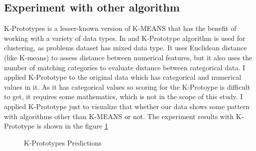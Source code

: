 \documentclass[12pt]{article}
\begin{document}
\subsection{Experiment with other algorithm}
K-Prototypes is a lesser-known version of K-MEANS that has the benefit of working with a variety of data types. In \citep{kp02} and \citep{kp01} K-Prototype algorithm is used for clustering, as problems dataset has mixed data type. It uses Euclidean distance (like K-means) to assess distance between numerical features, but it also uses the number of matching categories to evaluate distance between categorical data. I applied K-Prototype to the original data which has categorical and numerical values in it. As it has categorical values so scoring for the K-Protoype is difficult to get, it requires some mathematics, which is not in the scope of this study. I applied K-Prototype just to visualize that whether our data shows some pattern with algorithms other than K-MEANS or not. The experiment results with K-Prototype is shown in the figure \ref{fig:k_pro_re}


\begin{figure}[h!]
	\centering
	\qquad
	
	\caption{K-Prototypes Predictions}%
	\label{fig:k_pro_re}%
\end{figure}
\end{document}
